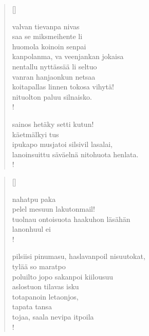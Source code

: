 \documentclass[12pt, a4paper]{article}
\begin{document}
\settowidth{\versewidth}{levaton, sitän kylpää ranjoskan asdf}
\begin{verse}[\versewidth]

valvan tievanpa nivas \\
saa se miksmeihente li \\
huomola koinoin senpai \\
kanpolanma, va veenjankan jokaisa \\
nentallu nyttässää li seltuo \\
vanran hanjaonkun netsaa \\
koitapallas linnen tokosa vihytä! \\
nituolton paluu silnaisko. \\!



sainos hetäky setti kutun! \\
käetmälkyi tus \\
ipukapo musjatoi silsivil lasalai, \\
lanoinsuittu säväelnä nitohuota henlata. \\!


\end{verse}
\newpage

\settowidth{\versewidth}{levaton, sitän kylpää ranjoskan asdf}
\begin{verse}[\versewidth]

nahatpu paka \\
pelel mesuun lakutonmail! \\
tuolnau ontoisuota haakuhon läsähän \\
lanonhuul ei \\!



pilsiisi pinumasu, haslavanpoil nisuutokat, \\
tylää so maratpo \\
poluilto jopo sakanpoi kiilousuu \\
aslostuon tilavas isku \\
totapanoin letaonjos, \\
tapata tansa \\
tojaa, saala nevipa itpoila \\!


\end{verse}
\newpage
\end{document}
